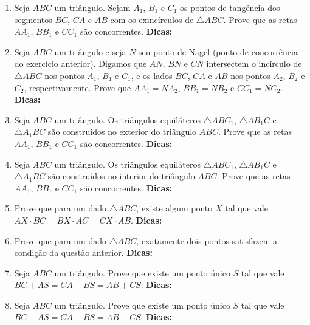 \documentclass{article}
\newcommand{\dica}{\textbf{Dicas:}}
\newcommand{\iniTri}{Seja $ABC$ um triângulo}
\begin{document}
\begin{multicols}{2}
\begin{enumerate}
    \item Seja $ABC$ um triângulo. Sejam $A_1$, $B_1$ e $C_1$ os pontos de tangência dos segmentos $BC$, $CA$ e $AB$ com os exincírculos de $\triangle ABC$. Prove que as retas $AA_1$, $BB_1$ e $CC_1$ são concorrentes. \dica %
    
    \item Seja $ABC$ um triângulo e seja $N$ seu ponto de Nagel (ponto de concorrência do exercício anterior). Digamos que $AN$, $BN$ e $CN$ intersectem o incírculo de $\triangle ABC$ nos pontos $A_1$, $B_1$ e $C_1$, e os lados $BC$, $CA$ e $AB$ nos pontos $A_2$, $B_2$ e $C_2$, respectivamente. Prove que $AA_1=NA_2$, $BB_1=NB_2$ e $CC_1=NC_2$. \dica %
    
    \item Seja $ABC$ um triângulo. Os triângulos equiláteros $\triangle ABC_1$, $\triangle AB_1C$ e $\triangle A_1BC$ são construídos no exterior do triângulo $ABC$. Prove que as retas $AA_1$, $BB_1$ e $CC_1$ são concorrentes. \dica %
    
    \item \iniTri. Os triângulos equiláteros $\triangle ABC_1$, $\triangle AB_1C$ e $\triangle A_1BC$ são construídos no interior do triângulo $ABC$. Prove que as retas $AA_1$, $BB_1$ e $CC_1$ são concorrentes. \dica %
    
    \item Prove que para um dado $\triangle ABC$, existe algum ponto $X$ tal que vale $AX\cdot BC = BX\cdot AC = CX \cdot AB$. \dica %
    
    \item Prove que para um dado $\triangle ABC$, exatamente dois pontos satisfazem a condição da questão anterior. \dica %
    
    \item \iniTri. Prove que existe um ponto único $S$ tal que vale $BC+AS = CA+BS = AB+CS$. \dica %
    
    \item \iniTri. Prove que existe um ponto único $S$ tal que vale $BC-AS = CA-BS = AB-CS$. \dica %
    

\end{enumerate}
\end{multicols}
\end{document}

